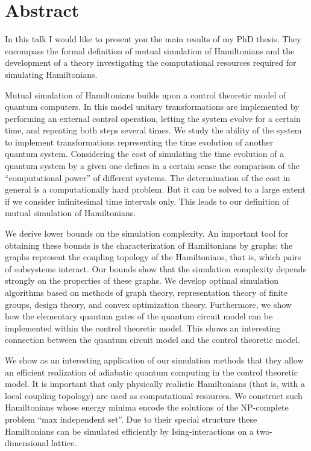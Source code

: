 \documentclass[fullpage,twoside,english,12pt]{book}
\begin{document}
\section*{Abstract}
In this talk I would like to present you the main results of my PhD
thesis. They encompass the formal definition of mutual simulation of
Hamiltonians and the development of a theory investigating the
computational resources required for simulating Hamiltonians.

Mutual simulation of Hamiltonians builds upon a control theoretic
model of quantum computers. In this model unitary transformations are
implemented by performing an external control operation, letting the
system evolve for a certain time, and repeating both steps several
times. We study the ability of the system to implement transformations
representing the time evolution of another quantum system. Considering
the cost of simulating the time evolution of a quantum system by a
given one defines in a certain sense the comparison of the
``computational power'' of different systems. The determination of the
cost in general is a computationally hard problem. But it can be
solved to a large extent if we consider infinitesimal time intervals
only. This leads to our definition of mutual simulation of
Hamiltonians.

We derive lower bounds on the simulation complexity. An important tool
for obtaining these bounds is the characterization of Hamiltonians by
graphs; the graphs represent the coupling topology of the
Hamiltonians, that is, which pairs of subsystems interact. Our bounds
show that the simulation complexity depends strongly on the properties
of these graphs. We develop optimal simulation algorithms based on
methods of graph theory, representation theory of finite groups,
design theory, and convex optimization theory. Furthermore, we show
how the elementary quantum gates of the quantum circuit model can be
implemented within the control theoretic model. This shows an
interesting connection between the quantum circuit model and the
control theoretic model.

We show as an interesting application of our simulation methods that
they allow an efficient realization of adiabatic quantum computing in
the control theoretic model. It is important that only physically
realistic Hamiltonians (that is, with a local coupling topology) are
used as computational resources. We construct such Hamiltonians whose
energy minima encode the solutions of the NP-complete problem ``max
independent set''. Due to their special structure these Hamiltonians
can be simulated efficiently by Ising-interactions on a
two-dimensional lattice.
\end{document}

